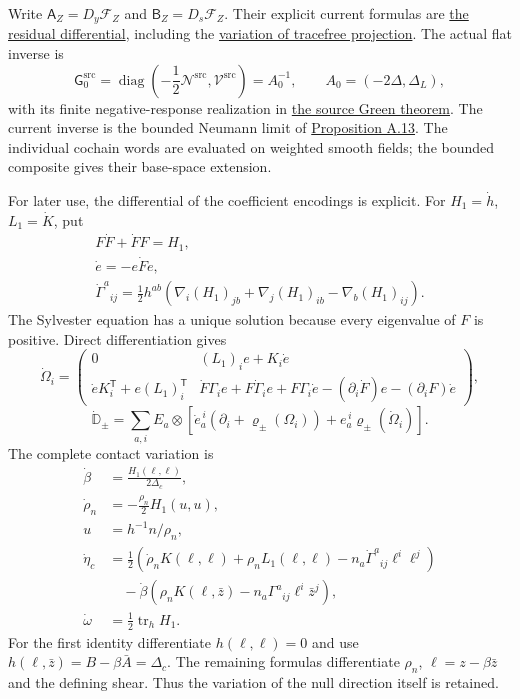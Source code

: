 \documentclass[
  english,
  11pt,
  reqno]{amsart}
\begin{document}
Write \(\mathsf A_Z=D_y\mathcal F_Z\) and
\(\mathsf B_Z=D_s\mathcal F_Z\). Their explicit current formulas are
\hyperref[eq:online-current-explicit-linearized-residual]{the residual
differential}, including the
\hyperref[eq:online-current-tracefree-variation]{variation of tracefree
projection}. The actual flat inverse is \[
\mathsf G_0^{\mathrm{src}}
=\operatorname{diag}\left(-\frac12\mathcal N^{\mathrm{src}},\mathcal V^{\mathrm{src}}\right)
=A_0^{-1},\qquad A_0=(-2\Delta,\Delta_L),
\] with its finite negative-response realization in
\hyperref[thm:online-negative-response-flat-green]{the source Green
theorem}. The current inverse is the bounded Neumann limit of
\hyperref[prop:online-current-inverse-horizontal-flatness]{Proposition
A.13}. The individual cochain words are evaluated on weighted smooth
fields; the bounded composite gives their base-space extension.

For later use, the differential of the coefficient encodings is
explicit. For \(H_1=\dot h\), \(L_1=\dot K\), put%
 \[
\begin{gathered}
F\dot F+\dot F F=H_1, \\
\dot e=-e\dot F e, \\
\dot\Gamma^a{}_{ij}
=\frac12h^{ab}(\nabla_i(H_1)_{jb}+\nabla_j(H_1)_{ib}-\nabla_b(H_1)_{ij}).
\end{gathered}
\] The Sylvester equation has a unique solution because every eigenvalue
of \(F\) is positive. Direct differentiation gives%
 \[
\dot\Omega_i=
\begin{pmatrix}
0&(L_1)_ie+K_i\dot e\\
\dot eK_i^{\mathsf T}+e(L_1)_i^{\mathsf T}
&\dot F\Gamma_i e+F\dot\Gamma_i e+F\Gamma_i\dot e
 -(\partial_i\dot F)e-(\partial_iF)\dot e
\end{pmatrix},
\] \label{eq:online-source-full-gradient-variation} \[
\dot{\mathbb D}_\pm
=\sum_{a,i}E_a\otimes
\left[\dot e_a^{\,i}(\partial_i+\varrho_\pm(\Omega_i))
+e_a^{\,i}\varrho_\pm(\dot\Omega_i)\right].
\] The complete contact variation is%
 \[
\begin{aligned}
\dot\beta&=\frac{H_1(\ell,\ell)}{2\Delta_c}, \\
\dot\rho_n&=-\frac{\rho_n}{2}H_1(u,u), \\
u&=h^{-1}n/\rho_n, \\
\dot\eta_c
&=\frac12\left(\dot\rho_nK(\ell,\ell)
+\rho_nL_1(\ell,\ell)-n_a\dot\Gamma^a{}_{ij}\ell^i\ell^j\right) \\
&\quad-\dot\beta\left(\rho_nK(\ell,\bar z)
-n_a\Gamma^a{}_{ij}\ell^i\bar z^j\right), \\
\dot\omega&=\frac12\operatorname{tr}_hH_1.
\end{aligned}
\] For the first identity differentiate \(h(\ell,\ell)=0\) and use
\(h(\ell,\bar z)=B-\beta\bar A=\Delta_c\). The remaining formulas
differentiate \(\rho_n\), \(\ell=z-\beta\bar z\) and the defining shear.
Thus the variation of the null direction itself is retained.
\end{document}

